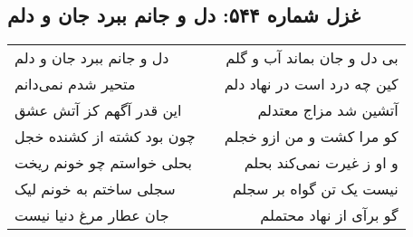 \begin{center}
\section*{غزل شماره ۵۴۴: دل و جانم ببرد جان و دلم}
\label{sec:544}
\begin{longtable}{l p{0.5cm} r}
دل و جانم ببرد جان و دلم
&&
بی دل و جان بماند آب و گلم
\\
متحیر شدم نمی‌دانم
&&
کین چه درد است در نهاد دلم
\\
این قدر آگهم کز آتش عشق
&&
آتشین شد مزاج معتدلم
\\
چون بود کشته از کشنده خجل
&&
کو مرا کشت و من ازو خجلم
\\
بحلی خواستم چو خونم ریخت
&&
و او ز غیرت نمی‌کند بحلم
\\
سجلی ساختم به خونم لیک
&&
نیست یک تن گواه بر سجلم
\\
جان عطار مرغ دنیا نیست
&&
گو برآی از نهاد محتملم
\\
\end{longtable}
\end{center}
